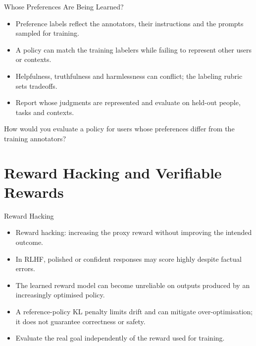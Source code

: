 \begin{frame}{Whose Preferences Are Being Learned?}
\begin{itemize}
\item Preference labels reflect the annotators, their instructions and the prompts sampled for training.
\item A policy can match the training labelers while failing to represent other users or contexts.
\item Helpfulness, truthfulness and harmlessness can conflict; the labeling rubric sets tradeoffs.
\item Report whose judgments are represented and evaluate on held-out people, tasks and contexts.
\end{itemize}
\ques How would you evaluate a policy for users whose preferences differ from the training annotators?
\end{frame}

\section{Reward Hacking and Verifiable Rewards}

\begin{frame}{Reward Hacking}
\begin{itemize}
\item Reward hacking: increasing the proxy reward without improving the intended outcome.
\item In RLHF, polished or confident responses may score highly despite factual errors.
\item The learned reward model can become unreliable on outputs produced by an increasingly optimised policy.
\item A reference-policy KL penalty limits drift and can mitigate over-optimisation; it does not guarantee correctness or safety.
\item Evaluate the real goal independently of the reward used for training.
\end{itemize}
\end{frame}

